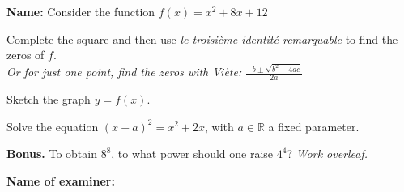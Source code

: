 \documentclass[8pt]{exam}
\begin{document}
\textbf{Name:} \dotfill Consider the function $f( x ) = x^2 + 8x + 12$

\begin{questions}
\question[2] Complete the square and then use \emph{le troisième identité remarquable} to find the zeros of $f$. \\
\emph{Or for just one point, find the zeros with Viète:} $\frac{-b \pm \sqrt{b^2-4ac}}{2a}$
\fillwithdottedlines{5cm}

\question[4] Sketch the graph $y = f(x)$.

\vspace{-2mm}
\begin{minipage}[t]{0.5\textwidth}
\vspace{0mm}

\fillwithdottedlines{65mm}

\end{minipage}
\hfill
\begin{minipage}[t]{0.4\textwidth}
\vspace{0mm}

\end{minipage}

\question[2] Solve the equation $(x+a)^2 = x^2+2x$, with $a\in \mathbb{R}$ a fixed parameter.
\fillwithdottedlines{45mm}

\question \textbf{Bonus.} To obtain $8^8$, to what power should one raise $4^4$?  \emph{Work overleaf.}

\vfill


\end{questions}

\begin{tcolorbox}

\textbf{Name of examiner:}

\begin{center}
\gradetable[h][questions]
\end{center}

\end{tcolorbox}
\end{document}
